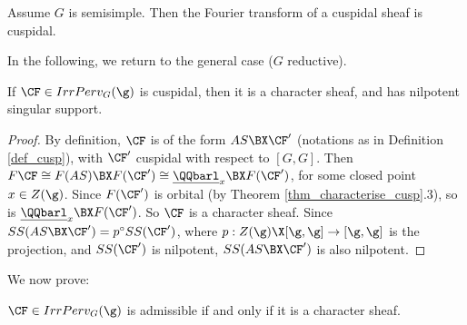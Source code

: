 \begin{corollary}
    Assume $G$ is semisimple. Then the Fourier transform of a cuspidal sheaf is cuspidal.
\end{corollary}

In the following, we return to the general case ($G$ reductive).

\begin{corollary}\label{cor_cusp_are_char}
     If $\CF\in IrrPerv_G(\g)$ is cuspidal, then it is a character sheaf, and has nilpotent singular support.
\end{corollary}

\begin{proof}
    By definition, $\CF$ is of the form $AS\BX\CF'$ (notations as in Definition \ref{def_cusp}), with $\CF'$ cuspidal with respect to $[G,G]$. Then $F\CF\cong F(AS)\BX F(\CF')\cong \underline{\QQbarl}_x\BX F(\CF')$, for some closed point $x\in Z(\g)$. Since $F(\CF')$ is orbital (by Theorem \ref{thm_characterise_cusp}.3), so is $\underline{\QQbarl}_x\BX F(\CF')$. So $\CF$ is a character sheaf. Since $SS(AS\BX\CF')=p^\circ SS(\CF')$, where $p: Z(\g)\X [\g,\g]\rightarrow [\g,\g]$ is the projection, and $SS(\CF')$ is nilpotent, $SS(AS\BX\CF')$ is also nilpotent.

\end{proof}

We now prove:

\begin{theorem}\label{thm_adm=char}
    $\CF\in IrrPerv_G(\g)$ is admissible if and only if it is a character sheaf.
\end{theorem}

